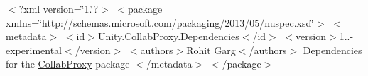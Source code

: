 $<$?xml version=\char`\"{}1.\char`\"{}?$>$ $<$package xmlns=\char`\"{}http\+://schemas.\+microsoft.\+com/packaging/2013/05/nuspec.\+xsd\char`\"{}$>$ $<$metadata$>$ $<$id$>$Unity.\+Collab\+Proxy.\+Dependencies$<$/id$>$ $<$version$>$1..-\/experimental$<$/version$>$ $<$authors$>$Rohit Garg$<$/authors$>$ Dependencies for the \mbox{\hyperlink{namespaceCollabProxy}{Collab\+Proxy}} package $<$/metadata$>$ $<$/package$>$ 